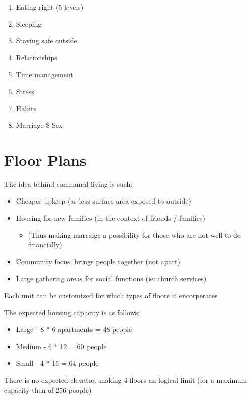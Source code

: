 \documentclass[CSHFoundation.tex]{subfiles}
\begin{document}
\begin{enumerate}
\item Eating right (5 levels)
\item Sleeping
\item Staying safe outside
\item Relationships
\item Time management
\item Stress
\item Habits
\item Marriage \$ Sex
\end{enumerate}

\section{Floor Plans}

The idea behind communal living is such:

\begin{itemize}
\item Cheaper upkeep (as less surface area exposed to outside)
\item Housing for new families (in the context of friends / families)
\begin{itemize}
	\item (Thus making marraige a possibility for those who are not well to do financially)
\end{itemize}\item Community focus, brings people together (not apart)
\item Large gathering areas for social functions (ie: church services)
\end{itemize}

Each unit can be customized for which types of floors it encorperates



The expected housing capacity is as follows:

\begin{itemize}
\item Large - 8 * 6 apartments = 48 people
\item Medium - 6 * 12 = 60 people
\item Small -  4 * 16 = 64 people
\end{itemize}

There is no expected elevator, making 4 floors an logical limit (for a maximum capacity then of  256 people)
\end{document}
